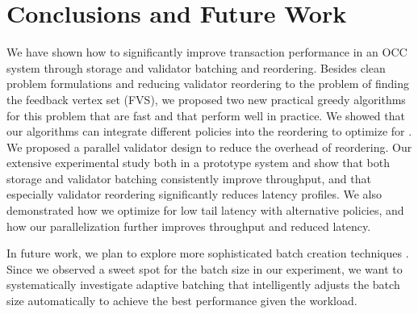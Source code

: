 \section{Conclusions and Future Work}\label{sec:conclusion}

We have shown how to significantly improve transaction performance in an OCC system through storage and validator batching and reordering. Besides clean problem formulations and
reducing validator reordering to the problem of finding the  feedback vertex set (FVS), we proposed two new practical greedy algorithms for this problem
that are fast and that perform well in practice. We showed that our algorithms can integrate different policies into the reordering to optimize for . We  proposed a parallel validator design to reduce the overhead of reordering. Our extensive experimental study both in a prototype system and  show that both storage and validator batching consistently improve throughput, and that especially validator reordering 
significantly reduces latency profiles. We also demonstrated how we optimize for low tail latency with alternative policies, and how our parallelization further improves
throughput and reduced latency.

In future work, we plan to explore more sophisticated batch creation techniques . Since we observed a sweet spot for the  batch size in our experiment, we want to systematically investigate adaptive batching that intelligently adjusts the batch size automatically to achieve the best performance given the workload.
